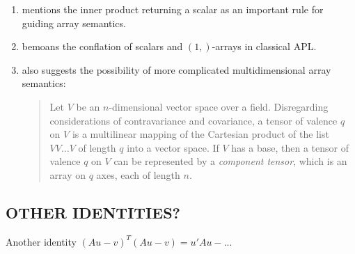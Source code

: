 \begin{enumerate}
\item \cite{More1973} mentions the inner product returning a scalar as an
	important rule for guiding array semantics.

\item \cite{Haegi1976} bemoans the conflation of scalars and $(1,)$-arrays in
	classical APL.

\item \cite[p. 153]{More1973} also suggests the possibility of more complicated
	multidimensional array semantics:

\begin{quote}
Let $V$ be an $n$-dimensional vector space over a field. Disregarding
considerations of contravariance and covariance, a tensor of valence $q$ on $V$
is a multilinear mapping of the Cartesian product of the list $V V \dots V$ of
length $q$ into a vector space. If $V$ has a base, then a tensor of valence $q$
on $V$ can be represented by a \textit{component tensor}, which is an array on
$q$ axes, each of length $n$.
\end{quote}

\end{enumerate}


\subsection{OTHER IDENTITIES?}
Another identity ${(Au - v)}^T(Au - v) = u'Au -...$
